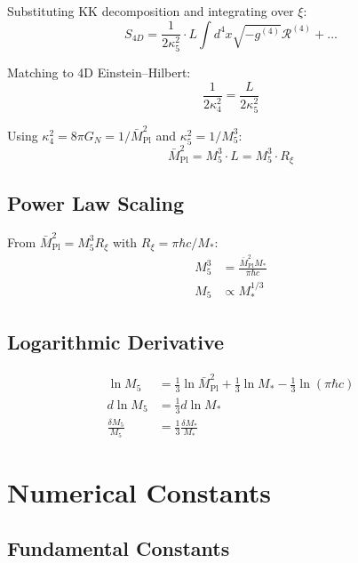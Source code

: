 \documentclass[11pt,a4paper]{article}
\newcommand{\Mpl}{\bar{M}_{\mathrm{Pl}}}
\newcommand{\Mfive}{M_5}
\newcommand{\Rxi}{R_\xi}
\newcommand{\Mstar}{M_*}
\theoremstyle{definition}
\theoremstyle{plain}
\theoremstyle{remark}
\begin{document}
Substituting KK decomposition and integrating over $\xi$:
\begin{equation}
S_{4D} = \frac{1}{2\kappa_5^2} \cdot L \int d^4x \sqrt{-g^{(4)}} \mathcal{R}^{(4)} + \ldots
\label{eq:app-4d-action}
\end{equation}

Matching to 4D Einstein--Hilbert:
\begin{equation}
\frac{1}{2\kappa_4^2} = \frac{L}{2\kappa_5^2}
\label{eq:app-matching}
\end{equation}

Using $\kappa_4^2 = 8\pi G_N = 1/\Mpl^2$ and $\kappa_5^2 = 1/\Mfive^3$:
\begin{equation}
\Mpl^2 = \Mfive^3 \cdot L = \Mfive^3 \cdot \Rxi
\label{eq:app-bridge}
\end{equation}

\subsection{Power Law Scaling}

From $\Mpl^2 = \Mfive^3 \Rxi$ with $\Rxi = \pi\hbar c/\Mstar$:
\begin{align}
\Mfive^3 &= \frac{\Mpl^2 \Mstar}{\pi\hbar c} \label{eq:app-M5-cubed} \\
\Mfive &\propto \Mstar^{1/3} \label{eq:app-scaling}
\end{align}

\subsection{Logarithmic Derivative}

\begin{align}
\ln\Mfive &= \frac{1}{3}\ln\Mpl^2 + \frac{1}{3}\ln\Mstar - \frac{1}{3}\ln(\pi\hbar c) \label{eq:app-ln-M5} \\
d\ln\Mfive &= \frac{1}{3}d\ln\Mstar \label{eq:app-dln-M5} \\
\frac{\delta\Mfive}{\Mfive} &= \frac{1}{3}\frac{\delta\Mstar}{\Mstar} \label{eq:app-error}
\end{align}

\section{Numerical Constants}
\label{app:constants}

\subsection{Fundamental Constants}
\end{document}
